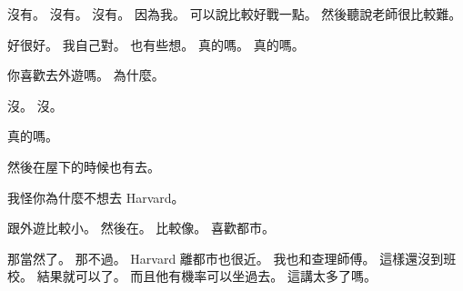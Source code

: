 \hypertarget{c01:cue:2397}{}沒有。
\hypertarget{c01:cue:2398}{}沒有。
\hypertarget{c01:cue:2399}{}沒有。
\hypertarget{c01:cue:2400}{}因為我。
\hypertarget{c01:cue:2401}{}可以說比較好戰一點。
\hypertarget{c01:cue:2402}{}然後聽說老師很比較難。

\hypertarget{c01:cue:2403}{}好很好。
\hypertarget{c01:cue:2404}{}我自己對。
\hypertarget{c01:cue:2405}{}也有些想。
\hypertarget{c01:cue:2406}{}真的嗎。
\hypertarget{c01:cue:2407}{}真的嗎。

\hypertarget{c01:cue:2408}{}你喜歡去外遊嗎。
\hypertarget{c01:cue:2409}{}為什麼。

\hypertarget{c01:cue:2410}{}沒。
\hypertarget{c01:cue:2411}{}沒。

\hypertarget{c01:cue:2412}{}真的嗎。

\hypertarget{c01:cue:2413}{}然後在屋下的時候也有去。

\hypertarget{c01:cue:2414}{}我怪你為什麼不想去 Harvard。

\hypertarget{c01:cue:2415}{}跟外遊比較小。
\hypertarget{c01:cue:2416}{}然後在。
\hypertarget{c01:cue:2417}{}比較像。
\hypertarget{c01:cue:2418}{}喜歡都市。

\hypertarget{c01:cue:2419}{}那當然了。
\hypertarget{c01:cue:2420}{}那不過。
\hypertarget{c01:cue:2421}{}Harvard 離都市也很近。
\hypertarget{c01:cue:2422}{}我也和查理師傅。
\hypertarget{c01:cue:2423}{}這樣還沒到班校。
\hypertarget{c01:cue:2424}{}結果就可以了。
\hypertarget{c01:cue:2425}{}而且他有機率可以坐過去。
\hypertarget{c01:cue:2426}{}這講太多了嗎。

